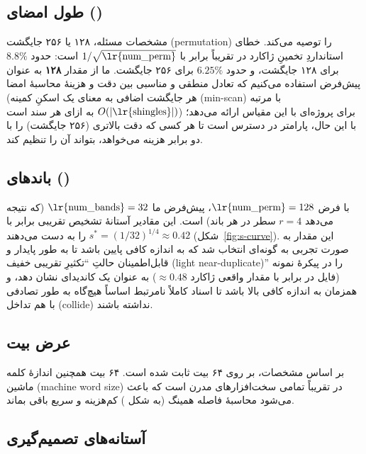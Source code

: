 \documentclass[11pt,a4paper]{article}
\begin{document}
	\subsection{طول امضای  ()}
	
	مشخصات مسئله، ۱۲۸ یا ۲۵۶ جایگشت (permutation) را توصیه می‌کند. خطای استانداردِ تخمینِ ژاکارد در  تقریباً برابر با $1/\sqrt{\text{\lr{num\_perm}}}$ است: حدود $8.8\%$ برای ۱۲۸ جایگشت، و حدود $6.25\%$ برای ۲۵۶ جایگشت. ما از مقدار \textbf{۱۲۸} به عنوان پیش‌فرض استفاده می‌کنیم که تعادل منطقی و مناسبی بین دقت و هزینهٔ محاسبهٔ امضا (هر جایگشت اضافی به معنای یک اسکنِ کمینه (min-scan) با مرتبه $O(|\text{\lr{shingles}}|)$ به ازای هر سند است) برای پروژه‌ای با این مقیاس ارائه می‌دهد؛ با این حال، پارامتر  در دسترس است تا هر کسی که دقت بالاتری (۲۵۶ جایگشت) را با دو برابر هزینه می‌خواهد، بتواند آن را تنظیم کند.
	
	\subsection{باندهای  ()}
	
	با فرض $\text{\lr{num\_perm}}=128$، پیش‌فرض ما $\text{\lr{num\_bands}}=32$ (که نتیجه می‌دهد $r=4$ سطر در هر باند) است. این مقادیر آستانهٔ تشخیص تقریبی برابر با $s^{*} = (1/32)^{1/4} \approx 0.42$ را به دست می‌دهند (شکل~\ref{fig:s-curve}). این مقدار به صورت تجربی به گونه‌ای انتخاب شد که به اندازه کافی پایین باشد تا به طور پایدار و قابل‌اطمینان حالتِ ``تکثیرِ تقریبی خفیف (light near-duplicate)'' را در پیکرهٔ نمونه (فایل  در برابر  با مقدار واقعی ژاکارد $\approx 0.48$) به عنوان یک کاندیدای  نشان دهد، و همزمان به اندازه کافی بالا باشد تا اسناد کاملاً نامرتبط اساساً هیچ‌گاه به طور تصادفی با هم تداخل (collide) نداشته باشند.
	
	\subsection{عرض بیت }
	
	بر اساس مشخصات، بر روی ۶۴ بیت ثابت شده است. ۶۴ بیت همچنین اندازهٔ کلمه ماشین (machine word size) در تقریباً تمامی سخت‌افزارهای مدرن است که باعث می‌شود محاسبهٔ فاصله همینگ (به شکل ) کم‌هزینه و سریع باقی بماند.
	
	\subsection{آستانه‌های تصمیم‌گیری}
	
\end{document}
